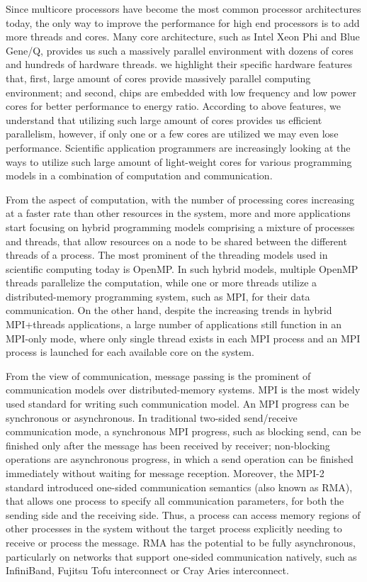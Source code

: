 Since multicore processors have become the most common processor architectures today, the only way to 
improve the performance for high end processors is to add more threads 
and cores. Many core architecture, such as Intel Xeon Phi and Blue Gene/Q, 
provides us such a massively parallel environment with dozens of cores and
hundreds of hardware threads. we highlight their specific hardware features 
that, first, large amount of cores provide massively parallel computing 
environment; and second, chips are embedded with low frequency and low power
cores for better performance to energy ratio. 
According to above features, we understand that utilizing such large amount 
of cores provides us efficient parallelism, 
however, if only one or a few cores are utilized we may even lose performance. 
Scientific application programmers are increasingly looking at the ways to 
utilize such large amount of light-weight cores for various programming 
models in a combination of computation and communication. 

From the aspect of computation, with the number of processing cores increasing at 
a faster rate than other resources in the system, more and more applications 
start focusing on hybrid programming models comprising a mixture of processes 
and threads, that allow resources on a node to be shared between the different 
threads of a process. The most prominent of the 
threading models used in scientific computing today is OpenMP. In such hybrid models, 
multiple OpenMP threads parallelize the computation, while one or more threads 
utilize a distributed-memory programming system, such as MPI, for their data 
communication. On the other hand, despite the increasing trends in hybrid MPI+threads
applications, a large number of applications still function in an MPI-only 
mode, where only single thread exists in each MPI process and an MPI process 
is launched for each available core on the system.

From the view of communication, message passing is the prominent of communication
models over distributed-memory systems. MPI is the most widely used standard for 
writing such communication model. An MPI progress can be synchronous or asynchronous. 
In traditional two-sided send\slash receive communication mode, a synchronous MPI progress, such as 
blocking send, can be finished only after the message has been received by receiver;
non-blocking operations are asynchronous progress, in which a send 
operation can be finished immediately without waiting for message reception. 
Moreover, the MPI-2 standard introduced one-sided communication semantics (also known as RMA), 
that allows one process to specify all communication parameters, for both the 
sending side and the receiving side. Thus, a process can access memory regions 
of other processes in the system without the target process explicitly needing 
to receive or process the message. RMA has the potential to be fully asynchronous, 
particularly on networks that support one-sided communication natively, 
such as InfiniBand, Fujitsu Tofu interconnect or Cray Aries interconnect.

